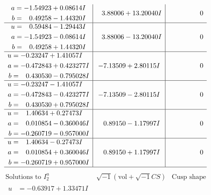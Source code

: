 \documentclass[1p]{elsarticle_modified}
\theoremstyle{definition}
\newcommand{\I}{\sqrt{-1}}
\begin{document}
$$\begin{array}{c|c|c}
\begin{aligned}
a &= -1.54923 + 0.08614 I \\
b &= \phantom{-}0.49258 - 1.44320 I\end{aligned}
 & \phantom{-}3.88006 + 13.20040 I & \phantom{-0.000000 } 0 \\ \hline\begin{aligned}
u &= \phantom{-}0.59484 - 1.29443 I \\
a &= -1.54923 - 0.08614 I \\
b &= \phantom{-}0.49258 + 1.44320 I\end{aligned}
 & \phantom{-}3.88006 - 13.20040 I & \phantom{-0.000000 } 0 \\ \hline\begin{aligned}
u &= -0.23247 + 1.41057 I \\
a &= -0.472843 + 0.423277 I \\
b &= \phantom{-}0.430530 - 0.795028 I\end{aligned}
 & -7.13509 + 2.80115 I & \phantom{-0.000000 } 0 \\ \hline\begin{aligned}
u &= -0.23247 - 1.41057 I \\
a &= -0.472843 - 0.423277 I \\
b &= \phantom{-}0.430530 + 0.795028 I\end{aligned}
 & -7.13509 - 2.80115 I & \phantom{-0.000000 } 0 \\ \hline\begin{aligned}
u &= \phantom{-}1.40634 + 0.27473 I \\
a &= \phantom{-}0.010854 - 0.360046 I \\
b &= -0.260719 - 0.957000 I\end{aligned}
 & \phantom{-}0.89150 - 1.17997 I & \phantom{-0.000000 } 0 \\ \hline\begin{aligned}
u &= \phantom{-}1.40634 - 0.27473 I \\
a &= \phantom{-}0.010854 + 0.360046 I \\
b &= -0.260719 + 0.957000 I\end{aligned}
 & \phantom{-}0.89150 + 1.17997 I & \phantom{-0.000000 } 0\\
 \hline 
 \end{array}$$\newpage$$\begin{array}{c|c|c}  
\text{Solutions to }I^u_{2}& \I (\text{vol} + \sqrt{-1}CS) & \text{Cusp shape}\\
 \hline 
\begin{aligned}
u &= -0.63917 + 1.33471 I \\

\end{aligned}
\end{array}$$
\end{document}
